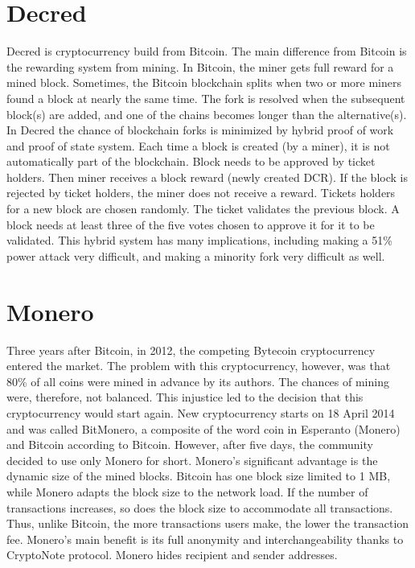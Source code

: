 \section{Decred}
Decred is cryptocurrency build from Bitcoin. The main difference from Bitcoin is the rewarding system from mining. In Bitcoin, the miner gets full reward for a mined block. Sometimes, the Bitcoin blockchain splits when two or more miners found a block at nearly the same time. The fork is resolved when the subsequent block(s) are added, and one of the chains becomes longer than the alternative(s). In Decred the chance of blockchain forks is minimized by hybrid proof of work and proof of state system. Each time a block is created (by a miner), it is not automatically part of the blockchain. Block needs to be approved by ticket holders. Then miner receives a block reward (newly created DCR). If the block is rejected by ticket holders, the miner does not receive a reward. Tickets holders for a new block are chosen randomly. The ticket validates the previous block. A block needs at least three of the five votes chosen to approve it for it to be validated.  This hybrid system has many implications, including making a 51\% power attack very difficult, and making a minority fork very difficult as well. \cite{decredWhitePaper}

\section{Monero}
Three years after Bitcoin, in 2012, the competing Bytecoin cryptocurrency entered the market. The problem with this cryptocurrency, however, was that 80\% of all coins were mined in advance by its authors. The chances of mining were, therefore, not balanced. This injustice led to the decision that this cryptocurrency would start again. New cryptocurrency starts on 18 April 2014 and was called BitMonero, a composite of the word coin in Esperanto (Monero) and Bitcoin according to Bitcoin. However, after five days, the community decided to use only Monero for short. Monero's significant advantage is the dynamic size of the mined blocks. Bitcoin has one block size limited to 1 MB, while Monero adapts the block size to the network load. If the number of transactions increases, so does the block size to accommodate all transactions. Thus, unlike Bitcoin, the more transactions users make, the lower the transaction fee. Monero's main benefit is its full anonymity and interchangeability thanks to CryptoNote protocol\cite{van2013cryptonote}. Monero hides recipient and sender addresses. \cite{moneroTracebility}


